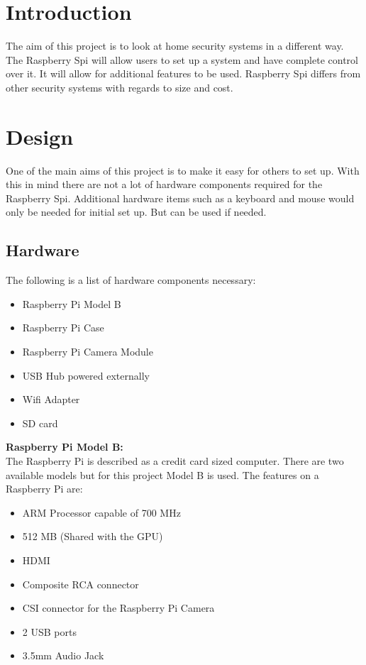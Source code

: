 \documentclass[]{report}
\begin{document}
\tableofcontents
\chapter {Introduction}
\label {ch:intro} 
The aim of this project is to look at home security systems in a different way. The Raspberry Spi will allow users to set up a system and have complete control over it. It will allow for additional features to be used. 
Raspberry Spi differs from other security systems with regards to size and cost. 
% 
% 
\chapter {Design}
\label {ch:design}
	One of the main aims of this project is to make it easy for others to set up. With this in mind there are not a lot of hardware components required for the Raspberry Spi. Additional hardware items such as a keyboard and mouse would only be needed for initial set up. But can be used if needed. \\
	
\section {Hardware}	
\label {sec:hardware}

The following is a list of hardware components necessary:\\
\begin {itemize}
  \item Raspberry Pi Model B
  \item Raspberry Pi Case
  \item Raspberry Pi Camera Module
  \item USB Hub powered externally
  \item Wifi Adapter
  \item SD card
\end {itemize} 

{\bf Raspberry Pi Model B:} \\

The Raspberry Pi is described as a credit card sized computer. There are two available models but for this project Model B is used. The features on a Raspberry Pi are:
\begin {itemize}
  \item ARM Processor capable of 700 MHz
  \item 512 MB (Shared with the GPU)
  \item HDMI
  \item Composite RCA connector
  \item CSI connector for the Raspberry Pi Camera
  \item 2 USB ports
  \item 3.5mm Audio Jack\\
\end {itemize}
  
\end{document}

